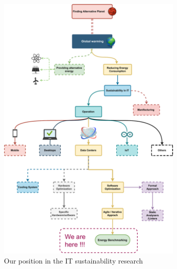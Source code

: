 \begin{figure}[!h]
    \caption{Our position in the IT sustainability research}
    \label{fig:thesis_position}
    \includegraphics[width=0.8\textwidth,height=\textheight,keepaspectratio]{chapters/thesis_position.pdf}
\end{figure}





